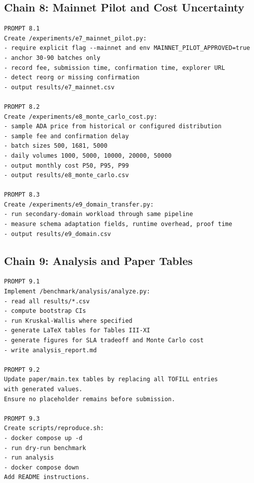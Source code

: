 \documentclass[journal]{IEEEtran}
\begin{document}
\subsection*{Chain 8: Mainnet Pilot and Cost Uncertainty}

\begin{lstlisting}[language={}, basicstyle=\ttfamily\scriptsize]
PROMPT 8.1
Create /experiments/e7_mainnet_pilot.py:
- require explicit flag --mainnet and env MAINNET_PILOT_APPROVED=true
- anchor 30-90 batches only
- record fee, submission time, confirmation time, explorer URL
- detect reorg or missing confirmation
- output results/e7_mainnet.csv

PROMPT 8.2
Create /experiments/e8_monte_carlo_cost.py:
- sample ADA price from historical or configured distribution
- sample fee and confirmation delay
- batch sizes 500, 1681, 5000
- daily volumes 1000, 5000, 10000, 20000, 50000
- output monthly cost P50, P95, P99
- output results/e8_monte_carlo.csv

PROMPT 8.3
Create /experiments/e9_domain_transfer.py:
- run secondary-domain workload through same pipeline
- measure schema adaptation fields, runtime overhead, proof time
- output results/e9_domain.csv
\end{lstlisting}

\subsection*{Chain 9: Analysis and Paper Tables}

\begin{lstlisting}[language={}, basicstyle=\ttfamily\scriptsize]
PROMPT 9.1
Implement /benchmark/analysis/analyze.py:
- read all results/*.csv
- compute bootstrap CIs
- run Kruskal-Wallis where specified
- generate LaTeX tables for Tables III-XI
- generate figures for SLA tradeoff and Monte Carlo cost
- write analysis_report.md

PROMPT 9.2
Update paper/main.tex tables by replacing all TOFILL entries
with generated values.
Ensure no placeholder remains before submission.

PROMPT 9.3
Create scripts/reproduce.sh:
- docker compose up -d
- run dry-run benchmark
- run analysis
- docker compose down
Add README instructions.
\end{lstlisting}

\end{document}
